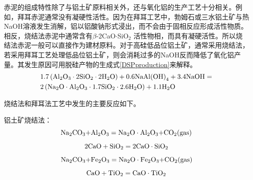 赤泥的组成特性除了与铝土矿原料相关外，还与氧化铝的生产工艺十分相关。例如，拜耳赤泥通常没有凝硬性活性。因为在拜耳工艺中，勃姆石或三水铝土矿与热NaOH溶液发生消解，铝以铝酸钠形式浸出，而不会由于固相反应形成活性物质。相反，烧结法赤泥中通常含有$ \beta $-2CaO$ \cdot $SiO$ _{\mathrm{2}} $ 活性物相，而具有凝硬活性。所以烧结法赤泥一般可以直接作为建材原料\cite{liu2009application}。对于高硅低品位铝土矿，通常采用烧结法，若采用拜耳工艺处理低品位铝土矿，则会消耗过多的NaOH反而降低了氧化铝产量\cite{liu2007characterization}。其发生原因可用脱硅产物的生成式\eqref{DSPproduction}来解释。
\begin{equation}\label{DSPproduction}
\begin{split}
& {\rm{1}}{\rm{.7}}\left( {{\rm{A}}{{\rm{l}}_\mathrm{2}}{{\rm{O}}_\mathrm{3}} \cdot {\rm{2}}{\rm{Si}}{{\rm{O}}_{\rm{2}}} \cdot {\rm{2}}{{\rm{H}}_{\rm{2}}}{\rm{O}}} \right) + {\rm{0.6}}{\rm{NaAl}}{\left( {{\rm{OH}}} \right)_{\rm{4}}} + {\rm{3.4}}{\rm{NaOH}} =\\
& {\rm{2}}\left( {{\rm{N}}{{\rm{a}}_{\rm{2}}}{\rm{O}} \cdot {\rm{A}}{{\rm{l}}_{\rm{2}}}{{\rm{O}}_{\rm{3}}} \cdot {\rm{1.7}}{\rm{Si}}{{\rm{O}}_{\rm{2}}} \cdot {\rm{2.6}}{{\rm{H}}_{\rm{2}}}{\rm{O}}} \right) + {\rm{1.1}}{{\rm{H}}_{\rm{2}}}{\rm{O}}
\end{split}
\end{equation}

烧结法和拜耳法工艺中发生的主要反应如下。

铝土矿烧结法：
\begin{equation}
{\rm{N}}{{\rm{a}}_{\rm{2}}}{\rm{C}}{{\rm{O}}_{\rm{3}}}{\rm{ + A}}{{\rm{l}}_{\rm{2}}}{{\rm{O}}_{\rm{3}}} = {\rm{N}}{{\rm{a}}_{\rm{2}}}{\rm{O}} \cdot {\rm{A}}{{\rm{l}}_{\rm{2}}}{{\rm{O}}_{\rm{3}}}{\rm{ + C}}{{\rm{O}}_{\rm{2}}} \rm{(gas)} 
\end{equation}
\begin{equation}
{\rm{2CaO + Si}}{{\rm{O}}_{\rm{2}}} = {\rm{2CaO}} \cdot {\rm{Si}}{{\rm{O}}_{\rm{2}}}\\
\end{equation}
\begin{equation}
{\rm{N}}{{\rm{a}}_{\rm{2}}}{\rm{C}}{{\rm{O}}_{\rm{3}}}{\rm{ + F}}{{\rm{e}}_{\rm{2}}}{{\rm{O}}_{\rm{3}}} = {\rm{N}}{{\rm{a}}_{\rm{2}}}{\rm{O}} \cdot {\rm{F}}{{\rm{e}}_{\rm{2}}}{{\rm{O}}_{\rm{3}}}{\rm{ + C}}{{\rm{O}}_{\rm{2}}} \rm{(gas)} 
\end{equation}
\begin{equation}\label{TiO2+CaO}
{\rm{CaO + Ti}}{{\rm{O}}_{\rm{2}}} = {\rm{CaO}} \cdot {\rm{Ti}}{{\rm{O}}_{\rm{2}}}
\end{equation}

